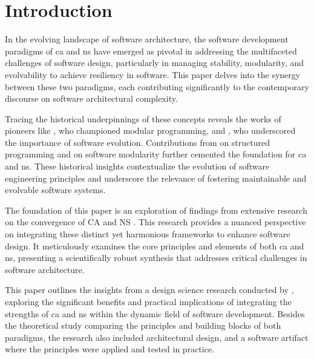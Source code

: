 \section{Introduction} \label{sec:introduction} 

In the evolving landscape of software architecture, the software development paradigms of
\gls{ca} and \gls{ns} have emerged as pivotal in addressing the multifaceted challenges of
software design, particularly in managing stability, modularity, and evolvability to
achieve resiliency in software. This paper delves into the synergy between these two
paradigms, each contributing significantly to the contemporary discourse on software
architectural complexity.

Tracing the historical underpinnings of these concepts reveals the works of pioneers like
\textcite{d_mcilroy_nato_1968}, who championed modular programming, and
\textcite{lehman_programs_1980}, who underscored the importance of software evolution.
Contributions from \textcite{dijkstra_letters_1968} on structured programming and
\textcite{parnas_criteria_1972} on software modularity further cemented the foundation for
\gls{ca} and \gls{ns}. These historical insights contextualize the evolution of software
engineering principles and underscore the relevance of fostering maintainable and
evolvable software systems.

The foundation of this paper is an exploration of findings from extensive research on
the convergence of CA and NS \cite{koks_convergence_2023}. This research provides a
nuanced perspective on integrating these distinct yet harmonious frameworks to enhance
software design. It meticulously examines the core principles and elements of both
\gls{ca} and \gls{ns}, presenting a scientifically robust synthesis that addresses
critical challenges in software architecture.

This paper outlines the insights from a design science research conducted by
, exploring the significant benefits and practical
implications of integrating the strengths of \gls{ca} and \gls{ns} within the dynamic
field of software development. Besides the theoretical study comparing the principles and
building blocks of both paradigms, the research also included architectural design, and a
software artifact where the principles were applied and tested in practice.  

